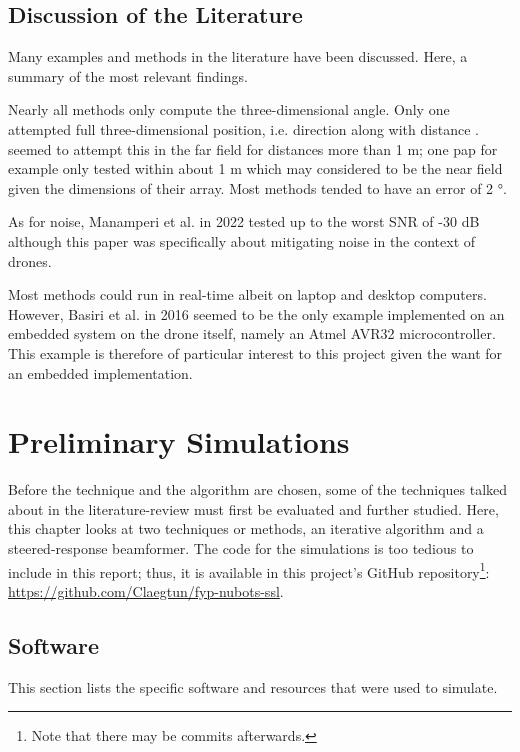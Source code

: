 \documentclass[notitlepage]{report}
\begin{document}
\section{Discussion of the Literature}

Many examples and methods in the literature have been discussed. Here, a summary of the most relevant findings.

Nearly all methods only compute the three-dimensional angle. Only one attempted full three-dimensional position, i.e. direction along with distance \cite{chen_sound_2019}. seemed to attempt this in the far field for distances more than 1 \si{m}; one pap for example \cite{bechler_system_2004} only tested within about 1 \si{m} which may considered to be the near field given the dimensions of their array. Most methods tended to have an error of 2 \si{\degree}.

As for noise, Manamperi et al. in 2022 \cite{manamperi_drone_2022} tested up to the worst SNR of -30 \si{dB} although this paper was specifically about mitigating noise in the context of drones.

Most methods could run in real-time albeit on laptop and desktop computers. However, Basiri et al. in 2016 \cite{basiri_-board_2016} seemed to be the only example implemented on an embedded system on the drone itself, namely an Atmel AVR32 microcontroller. This example is therefore of particular interest to this project given the want for an embedded implementation.


\chapter{Preliminary Simulations} \label{Preliminary_Simulations}

Before the technique and the algorithm are chosen, some of the techniques talked about in the literature-review must first be evaluated and further studied. Here, this chapter looks at two techniques or methods, an iterative algorithm and a steered-response beamformer. The code for the simulations is too tedious to include in this report; thus, it is available in this project's GitHub repository\footnote{Note that there may be commits afterwards.}: \url{https://github.com/Claegtun/fyp-nubots-ssl}.

\section{Software}

This section lists the specific software and resources that were used to simulate.
\end{document}
